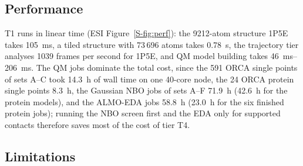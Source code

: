 \documentclass[journal=jcisd8,manuscript=article,layout=two-column]{achemso}
\begin{document}
\subsection{Performance}
T1 runs in linear time (ESI Figure~\ref{S-fig:perf}): the 9212-atom structure 1P5E takes \SI{105}{ms}, a tiled structure with 73\,696 atoms takes \SI{0.78}{s}, the trajectory tier analyses 1039 frames per second for 1P5E, and QM model building takes \SIrange{46}{206}{ms}. The QM jobs dominate the total cost, since the 591 ORCA single points of sets A--C took 14.3~h of wall time on one 40-core node, the 24 ORCA protein single points 8.3~h, the Gaussian NBO jobs of sets A--F 71.9~h (42.6~h for the protein models), and the ALMO-EDA jobs 58.8~h (23.0~h for the six finished protein jobs); running the NBO screen first and the EDA only for supported contacts therefore saves most of the cost of tier T4.

\subsection{Limitations}
\end{document}
